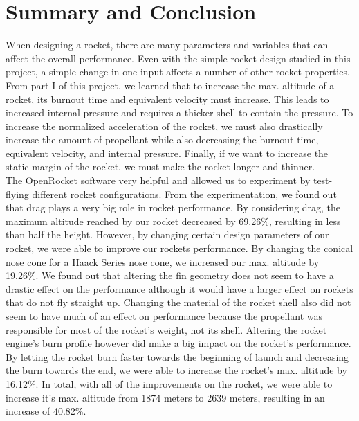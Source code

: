 \documentclass{report}
\begin{document}
\newpage
\section*{Summary and Conclusion}

When designing a rocket, there are many parameters and variables that can affect the overall performance.
Even with the simple rocket design studied in this project, a simple change in one input affects a number of other rocket properties.
From part I of this project, we learned that to increase the max. altitude of a rocket, its burnout time and equivalent velocity must increase. 
This leads to increased internal pressure and requires a thicker shell to contain the pressure.
To increase the normalized acceleration of the rocket, we must also drastically increase the amount of propellant while also decreasing the burnout time, equivalent velocity, and internal pressure.
Finally, if we want to increase the static margin of the rocket, we must make the rocket longer and thinner.\\

\noindent The OpenRocket software very helpful and allowed us to experiment by test-flying different rocket configurations.
From the experimentation, we found out that drag plays a very big role in rocket performance. 
By considering drag, the maximum altitude reached by our rocket decreased by 69.26\%, resulting in less than half the height.
However, by changing certain design parameters of our rocket, we were able to improve our rockets performance.
By changing the conical nose cone for a Haack Series nose cone, we increased our max. altitude by 19.26\%.
We found out that altering the fin geometry does not seem to have a drastic effect on the performance although it would have a larger effect on rockets that do not fly straight up.
Changing the material of the rocket shell also did not seem to have much of an effect on performance because the propellant was responsible for most of the rocket's weight, not its shell.
Altering the rocket engine's burn profile however did make a big impact on the rocket's performance.
By letting the rocket burn faster towards the beginning of launch and decreasing the burn towards the end, we were able to increase the rocket's max. altitude by 16.12\%.
In total, with all of the improvements on the rocket, we were able to increase it's max. altitude from 1874 meters to 2639 meters, resulting in an increase of 40.82\%.\\
\end{document}
